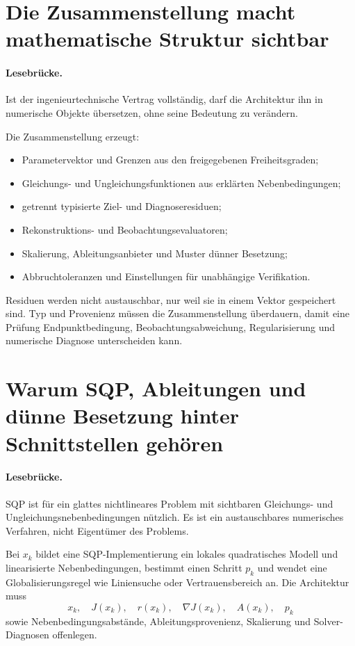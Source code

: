 \section{Die Zusammenstellung macht mathematische Struktur sichtbar}

\paragraph{Lesebrücke.}
Ist der ingenieurtechnische Vertrag vollständig, darf die Architektur ihn in
numerische Objekte übersetzen, ohne seine Bedeutung zu verändern.

Die Zusammenstellung erzeugt:
\begin{itemize}
\item Parametervektor und Grenzen aus den freigegebenen Freiheitsgraden;
\item Gleichungs- und Ungleichungsfunktionen aus erklärten Nebenbedingungen;
\item getrennt typisierte Ziel- und Diagnoseresiduen;
\item Rekonstruktions- und Beobachtungsevaluatoren;
\item Skalierung, Ableitungsanbieter und Muster dünner Besetzung;
\item Abbruchtoleranzen und Einstellungen für unabhängige Verifikation.
\end{itemize}

Residuen werden nicht austauschbar, nur weil sie in einem Vektor gespeichert
sind. Typ und Provenienz müssen die Zusammenstellung überdauern, damit eine
Prüfung Endpunktbedingung, Beobachtungsabweichung, Regularisierung und
numerische Diagnose unterscheiden kann.

\section{Warum SQP, Ableitungen und dünne Besetzung hinter Schnittstellen gehören}

\paragraph{Lesebrücke.}
SQP ist für ein glattes nichtlineares Problem mit sichtbaren Gleichungs- und
Ungleichungsnebenbedingungen nützlich. Es ist ein austauschbares numerisches
Verfahren, nicht Eigentümer des Problems.

Bei \(x_k\) bildet eine SQP-Implementierung ein lokales quadratisches Modell
und linearisierte Nebenbedingungen, bestimmt einen Schritt \(p_k\) und wendet
eine Globalisierungsregel wie Liniensuche oder Vertrauensbereich an. Die
Architektur muss
\[
x_k,\quad J(x_k),\quad r(x_k),\quad
\nabla J(x_k),\quad A(x_k),\quad p_k
\]
sowie Nebenbedingungsabstände, Ableitungsprovenienz, Skalierung und
Solver-Diagnosen offenlegen.


